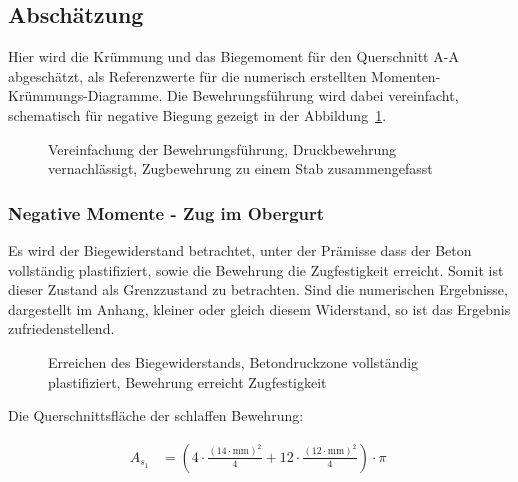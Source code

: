 \documentclass[
  11pt,
  letterpaper,
]{scrreprt}
\begin{document}
\subsection{Abschätzung}\label{abschuxe4tzung}

Hier wird die Krümmung und das Biegemoment für den Querschnitt A-A
abgeschätzt, als Referenzwerte für die numerisch erstellten
Momenten-Krümmungs-Diagramme. Die Bewehrungsführung wird dabei
vereinfacht, schematisch für negative Biegung gezeigt in der
Abbildung~\ref{fig-t6_qs_approx}.

\begin{figure}[H]


\caption{\label{fig-t6_qs_approx}Vereinfachung der Bewehrungsführung,
Druckbewehrung vernachlässigt, Zugbewehrung zu einem Stab
zusammengefasst}

\end{figure}%

\subsubsection{Negative Momente - Zug im
Obergurt}\label{negative-momente---zug-im-obergurt}

Es wird der Biegewiderstand betrachtet, unter der Prämisse dass der
Beton vollständig plastifiziert, sowie die Bewehrung die Zugfestigkeit
erreicht. Somit ist dieser Zustand als Grenzzustand zu betrachten. Sind
die numerischen Ergebnisse, dargestellt im Anhang, kleiner oder gleich
diesem Widerstand, so ist das Ergebnis zufriedenstellend.

\begin{figure}[H]


\caption{\label{fig-t6_qs_MR}Erreichen des Biegewiderstands,
Betondruckzone vollständig plastifiziert, Bewehrung erreicht
Zugfestigkeit}

\end{figure}%

Die Querschnittsfläche der schlaffen Bewehrung:

$$
\begin{aligned}
A_{s_{1}} &= \left( 4 \cdot \frac{ \left( 14 \cdot \mathrm{mm} \right) ^{ 2 } }{ 4 } + 12 \cdot \frac{ \left( 12 \cdot \mathrm{mm} \right) ^{ 2 } }{ 4 } \right) \cdot \pi \; 
\end{aligned}
$$
\end{document}
